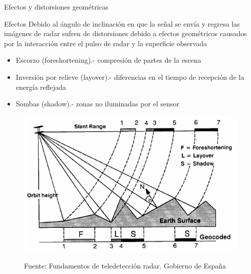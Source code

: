 \begin{frame}{Efectos y distorsiones geométricas}
  \footnotesize
  \begin{block}{Efectos}
    Debido al ángulo de inclinación en que la señal se envía y regresa las imágenes de radar sufren de distorsiones debido a efectos geométricos causados por la interacción entre el pulso de radar y la superficie observada
    \tiny
    \begin{itemize}
      \item Escorzo (foreshortening).- compresión de partes de la escena
      \item Inversión por relieve (layover).- diferencias en el tiempo de recepción de la energía reflejada
      \item Sombas (shadow).- zonas no iluminadas por el sensor
    \end{itemize}
  \end{block}

  \begin{figure}
    \begin{center}
        \includegraphics[scale=0.3]{img/section_03/principio_04}  \\
    \end{center}
    \caption{Fuente: Fundamentos de teledetección radar. Gobierno de España}
    \label{fig:resolucion_temporal}
  \end{figure}
\end{frame}
  
